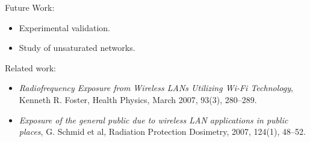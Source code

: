 \documentclass[portrait,a0b,final]{a0poster}
\newenvironment{poster}{
  \begin{center}
  \begin{minipage}[c]{0.98\textwidth}
}{
  \end{minipage} 
  \end{center}
}
\newenvironment{pcolumn}[1]{
  \begin{minipage}{#1\textwidth}
  \begin{center}
}{
  \end{center}
  \end{minipage}
}
\begin{document}
\begin{poster}
\begin{center}
\begin{pcolumn}{0.49}
{\medskip

Future Work:
\begin{itemize}
\item Experimental validation.
\item Study of unsaturated networks.
\end{itemize}

\medskip

Related work:
\begin{itemize}
\item \emph{Radiofrequency Exposure from Wireless LANs Utilizing Wi-Fi Technology}, Kenneth R. Foster, Health Physics, March 2007, 93(3), 280--289.  

\item \emph{Exposure of the general public due to wireless {LAN} applications in public places}, G. Schmid et al, Radiation Protection Dosimetry, 2007, 124(1), 48--52.
\end{itemize}



}
\end{pcolumn}
\end{center}

\end{poster}
\end{document}
